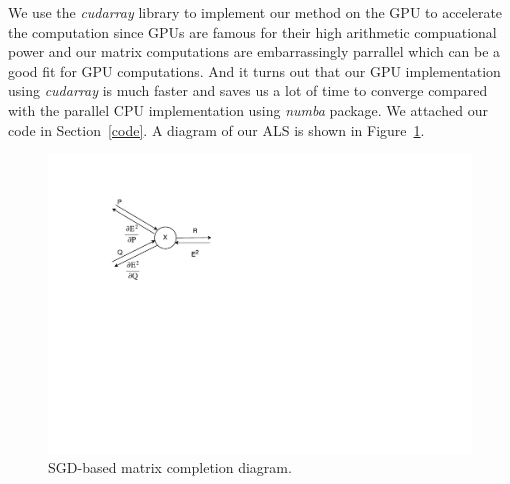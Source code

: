 \documentclass{article}
\begin{document}
We use the \emph{cudarray} library to implement our method on the GPU to accelerate the computation since GPUs are famous for their high arithmetic compuational power and our matrix computations are embarrassingly parrallel which can be a good fit for GPU computations. And it turns out that our GPU implementation using \emph{cudarray} is much faster and saves us a lot of time to converge compared with the parallel CPU implementation using \emph{numba} package. We attached our code in Section~\ref{code}.  A diagram of our ALS is shown in Figure~\ref{fig:sgd}.
\begin{figure}
  \centering
  \includegraphics[scale=0.8]{SGD}
  \caption{SGD-based matrix completion diagram.\label{fig:sgd}}
\end{figure}
\end{document}
